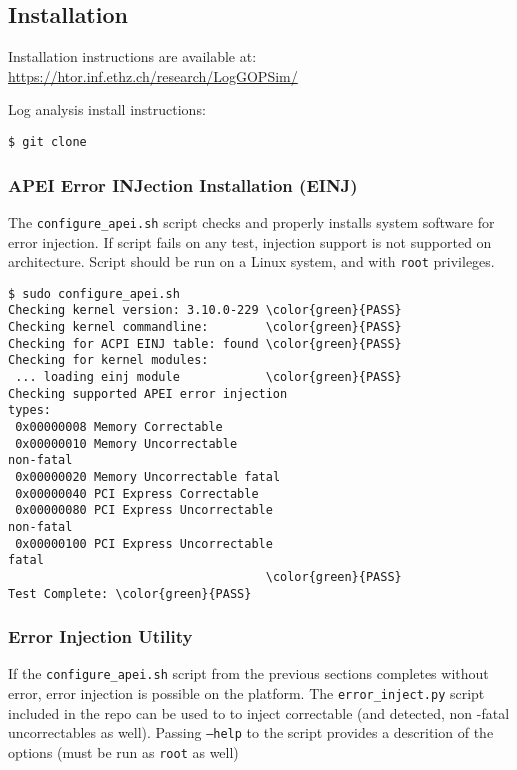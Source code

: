 \subsection{Installation}

Installation instructions are available at: \url{https://htor.inf.ethz.ch/research/LogGOPSim/}

Log analysis install instructions:

{\texttt{\$ git clone }}

\subsubsection{APEI Error INJection Installation (EINJ)}

The {\texttt{configure\_apei.sh}} script checks and properly installs system
software for error injection.  If script fails on any test, injection support is
not supported on architecture.  Script should be run on a Linux system, and with
{\texttt{root}} privileges.

\begin{Verbatim}[commandchars=\\\{\},frame=single]
 $ sudo configure_apei.sh
Checking kernel version: 3.10.0-229 \color{green}{PASS}
Checking kernel commandline:        \color{green}{PASS}
Checking for ACPI EINJ table: found \color{green}{PASS}
Checking for kernel modules:
 ... loading einj module            \color{green}{PASS}
Checking supported APEI error injection
types:
 0x00000008 Memory Correctable
 0x00000010 Memory Uncorrectable
non-fatal
 0x00000020 Memory Uncorrectable fatal
 0x00000040 PCI Express Correctable
 0x00000080 PCI Express Uncorrectable
non-fatal
 0x00000100 PCI Express Uncorrectable
fatal
                                    \color{green}{PASS}
Test Complete: \color{green}{PASS}
\end{Verbatim}


\subsubsection{Error Injection Utility}

If the {\texttt{configure\_apei.sh}} script from the previous sections completes
without error, error injection is possible on the platform.  The
{\texttt{error\_inject.py}} script included in the repo can be used to to inject
correctable (and detected, non -fatal uncorrectables as well).  Passing {\texttt{--help}}
to the script provides a descrition of the options (must be run as
{\texttt{root}} as well)

